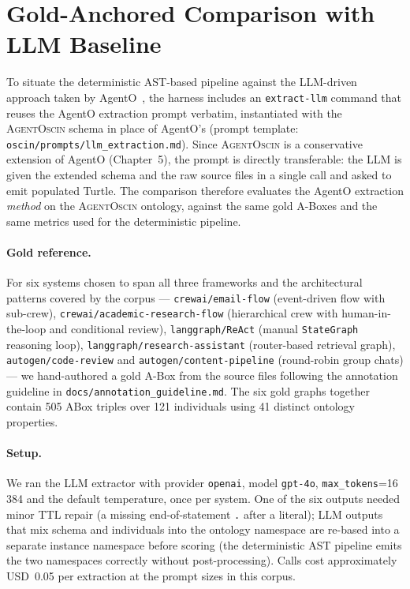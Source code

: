 \section{Gold-Anchored Comparison with LLM Baseline}\label{sec:llm-baseline}

To situate the deterministic AST-based pipeline against the LLM-driven
approach taken by AgentO~\cite{EKEK26}, the harness includes an
\texttt{extract-llm} command that reuses the AgentO extraction prompt
verbatim, instantiated with the \textsc{AgentOscin} schema in place of
AgentO's (prompt template: \texttt{oscin/prompts/llm\_extraction.md}).
Since \textsc{AgentOscin} is a conservative extension of AgentO
(Chapter~5), the prompt is directly transferable: the LLM is given the
extended schema and the raw source files in a single call and asked to
emit populated Turtle. The comparison therefore evaluates the AgentO
extraction \emph{method} on the \textsc{AgentOscin} ontology, against
the same gold A-Boxes and the same metrics used for the deterministic
pipeline.

\paragraph{Gold reference.} For six systems chosen to span all three
frameworks and the architectural patterns covered by the corpus —
\texttt{crewai/email-flow} (event-driven flow with sub-crew),
\texttt{crewai/academic-research-flow} (hierarchical crew with
human-in-the-loop and conditional review),
\texttt{langgraph/ReAct} (manual \texttt{StateGraph} reasoning loop),
\texttt{langgraph/research-assistant} (router-based retrieval graph),
\texttt{autogen/code-review} and \texttt{autogen/content-pipeline}
(round-robin group chats) — we hand-authored a gold A-Box from the
source files following the annotation guideline in
\texttt{docs/annotation\_guideline.md}. The six gold graphs together
contain 505 ABox triples over 121 individuals using 41 distinct
ontology properties.

\paragraph{Setup.} We ran the LLM extractor with provider
\texttt{openai}, model \texttt{gpt-4o}, \texttt{max\_tokens}=16\,384
and the default temperature, once per system. One of the six outputs
needed minor TTL repair (a missing end-of-statement \texttt{.} after a
literal); LLM outputs that mix schema and individuals into the
ontology namespace are re-based into a separate instance namespace
before scoring (the deterministic AST pipeline emits the two
namespaces correctly without post-processing). Calls cost approximately
USD~0.05 per extraction at the prompt sizes in this corpus.

